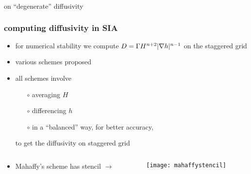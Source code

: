 \begin{frame}{on ``degenerate'' diffusivity}

\end{frame}


\begin{frame}
  \frametitle{computing diffusivity in SIA}

\begin{itemize}
\item for numerical stability we compute $D = \Gamma H^{n+2} |\nabla h|^{n-1}$ on the staggered grid
\item various schemes proposed
\item all schemes involve
  \begin{itemize}
  \item[$\circ$] averaging $H$
  \item[$\circ$] differencing $h$
  \item[$\circ$] in a ``balanced'' way, for better accuracy,
  \end{itemize}
to get the diffusivity on staggered grid
\end{itemize}

\begin{columns}
\begin{column}{0.65\textwidth}
\begin{itemize}
\item Mahaffy's scheme has stencil \large $\to$ \normalsize
\end{itemize}
\end{column}

\begin{column}{0.35\textwidth}
  \texttt{[image: mahaffystencil]}
\end{column}
\end{columns}
\end{frame}


